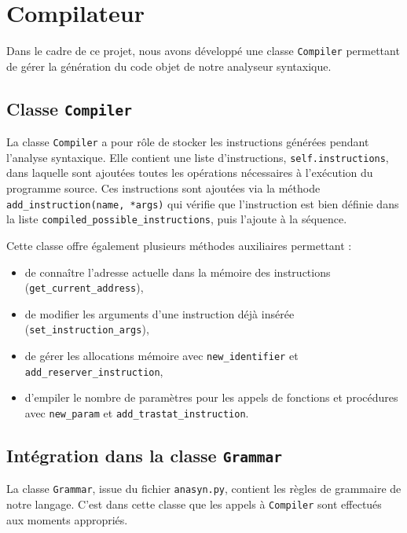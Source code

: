 \documentclass[a4paper, 12pt]{article}
\begin{document}
    \section{Compilateur}

    Dans le cadre de ce projet, nous avons développé une classe \texttt{Compiler} permettant de gérer la génération du code objet de notre analyseur syntaxique.

    \subsection{Classe \texttt{Compiler}}

    La classe \texttt{Compiler} a pour rôle de stocker les instructions générées pendant l'analyse syntaxique. Elle contient une liste d'instructions, \texttt{self.instructions}, dans laquelle sont ajoutées toutes les opérations nécessaires à l'exécution du programme source. Ces instructions sont ajoutées via la méthode \texttt{add\_instruction(name, *args)} qui vérifie que l'instruction est bien définie dans la liste \texttt{compiled\_possible\_instructions}, puis l’ajoute à la séquence.

    Cette classe offre également plusieurs méthodes auxiliaires permettant :

    \begin{itemize}
        \item de connaître l'adresse actuelle dans la mémoire des instructions (\texttt{get\_current\_address}),
        \item de modifier les arguments d'une instruction déjà insérée (\texttt{set\_instruction\_args}),
        \item de gérer les allocations mémoire avec \texttt{new\_identifier} et \texttt{add\_reserver\_instruction},
        \item d'empiler le nombre de paramètres pour les appels de fonctions et procédures avec \texttt{new\_param} et \texttt{add\_trastat\_instruction}.
    \end{itemize}

    \subsection{Intégration dans la classe \texttt{Grammar}}

    La classe \texttt{Grammar}, issue du fichier \texttt{anasyn.py}, contient les règles de grammaire de notre langage. C’est dans cette classe que les appels à \texttt{Compiler} sont effectués aux moments appropriés.
\end{document}
